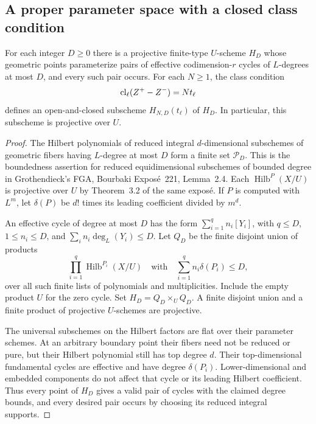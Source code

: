 \subsection{A proper parameter space with a closed class condition}

\begin{proposition}
For each integer $D\geq0$ there is a projective finite-type $U$-scheme $H_D$
whose geometric points parameterize pairs of effective codimension-$r$
cycles of $L$-degrees at most $D$, and every such pair occurs. For each
$N\geq1$, the class condition
\[
 \operatorname{cl}_\ell(Z^+-Z^-)=Nt_\ell
\]
defines an open-and-closed subscheme $H_{N,D}(t_\ell)$ of $H_D$. In particular,
this subscheme is projective over $U$.
\end{proposition}

\begin{proof}
The Hilbert polynomials of reduced integral $d$-dimensional subschemes of
geometric fibers having $L$-degree at most $D$ form a finite set
$\mathcal P_D$. This is the boundedness assertion for reduced equidimensional
subschemes of bounded degree in Grothendieck's FGA, Bourbaki Expos\'e~221,
Lemma~2.4. Each $\operatorname{Hilb}^{P}(X/U)$ is projective over $U$ by
Theorem~3.2 of the same expos\'e. If $P$ is computed with $L^m$, let
$\delta(P)$ be $d!$ times its leading coefficient divided by $m^d$.

An effective cycle of degree at most $D$ has the form
$\sum_{i=1}^q n_i[Y_i]$, with $q\leq D$, $1\leq n_i\leq D$, and
$\sum_i n_i\deg_L(Y_i)\leq D$. Let $Q_D$ be the finite disjoint union of
products
\[
 \prod_{i=1}^q\operatorname{Hilb}^{P_i}(X/U)
 \quad\text{with}\quad
 \sum_{i=1}^q n_i\delta(P_i)\leq D,
\]
over all such finite lists of polynomials and multiplicities. Include the
empty product $U$ for the zero cycle. Set $H_D=Q_D\times_U Q_D$. A finite
disjoint union and a finite product of projective $U$-schemes are projective.

The universal subschemes on the Hilbert factors are flat over their parameter
schemes. At an arbitrary boundary point their fibers need not be reduced or
pure, but their Hilbert polynomial still has top degree $d$. Their
top-dimensional fundamental cycles are effective and have degree
$\delta(P_i)$. Lower-dimensional and embedded components do not affect that
cycle or its leading Hilbert coefficient. Thus every point of $H_D$ gives a
valid pair of cycles with the claimed degree bounds, and every desired pair
occurs by choosing its reduced integral supports.


\end{proof}
